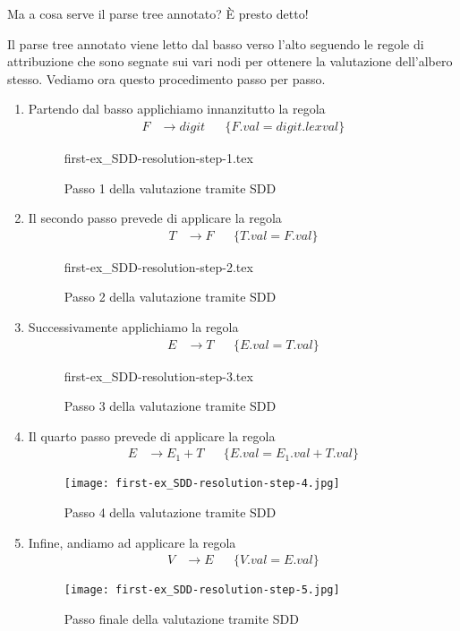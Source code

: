 \documentclass[class=book, crop=false, oneside, 12pt]{standalone}
\begin{document}
Ma a cosa serve il parse tree annotato? È presto detto!

\noindent Il parse tree annotato viene letto dal basso verso l'alto seguendo le regole di attribuzione che sono segnate sui vari nodi per ottenere la valutazione dell'albero stesso. Vediamo ora questo procedimento passo per passo.

\begin{enumerate}
    \item Partendo dal basso applichiamo innanzitutto la regola
    \begin{align*}
        F &\to digit & &\{F.val = digit.lexval\}
    \end{align*}
    \begin{figure}[H]
        \centering
        {first-ex_SDD-resolution-step-1.tex}
        \caption{Passo 1 della valutazione tramite SDD}
    \end{figure}
    \item Il secondo passo prevede di applicare la regola
    \begin{align*}
        T &\to F & &\{T.val = F.val\}
    \end{align*}
    \begin{figure}[H]
        \centering
        {first-ex_SDD-resolution-step-2.tex}
        \caption{Passo 2 della valutazione tramite SDD}
    \end{figure}
    \item Successivamente applichiamo la regola
    \begin{align*}
        E &\to T & &\{E.val = T.val\}
    \end{align*}
    \begin{figure}[H]
        \centering
        {first-ex_SDD-resolution-step-3.tex}
        \caption{Passo 3 della valutazione tramite SDD}
    \end{figure}
    \item Il quarto passo prevede di applicare la regola
    \begin{align*}
        E &\to E_1 + T & &\{E.val = E_1.val + T.val\}
    \end{align*}
    \begin{figure}[H]
        \centering
        \texttt{[image: first-ex\_SDD-resolution-step-4.jpg]}
        \caption{Passo 4 della valutazione tramite SDD}
    \end{figure}
    \item Infine, andiamo ad applicare la regola
    \begin{align*}
        V &\to E & &\{V.val = E.val\}
    \end{align*}
    \begin{figure}[H]
        \centering
        \texttt{[image: first-ex\_SDD-resolution-step-5.jpg]}
        \caption{Passo finale della valutazione tramite SDD}
    \end{figure}
\end{enumerate}
\end{document}
